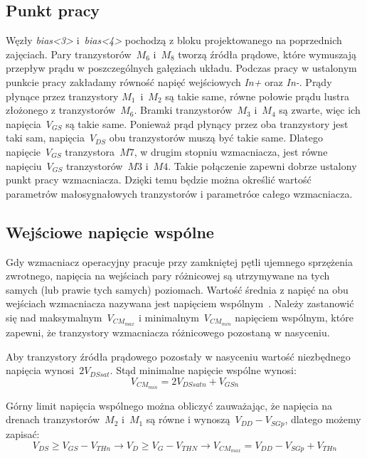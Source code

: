 \documentclass[twoside,pl,final]{labman}
\begin{document}
\subsection{Punkt pracy}
\label{schematic:op}
Węzły \emph{bias<3>} i~\emph{bias<4>} pochodzą z bloku
projektowanego na poprzednich zajęciach.
Pary tranzystorów~$M_6$ i~$M_8$ tworzą źródła prądowe,
które wymuszają przepływ prądu w poszczególnych gałęziach układu.
Podczas pracy w ustalonym punkcie pracy zakładamy równość
napięć wejściowych \emph{In+} oraz \emph{In-}.
Prądy płynące przez tranzystory $M_1$~i~$M_2$ są takie same,
równe połowie prądu lustra złożonego z tranzystorów~$M_6$.
Bramki tranzystorów~$M_3$ i~$M_4$ są zwarte,
więc ich napięcia~$V_{GS}$ są takie same.
Ponieważ prąd płynący przez oba tranzystory jest taki sam,
napięcia~$V_{DS}$ obu tranzystorów muszą być takie same.
Dlatego napięcie~$V_{GS}$ tranzystora~$M7$,
w drugim stopniu wzmacniacza,
jest równe napięciu~$V_{GS}$ tranzystorów~$M3$ i~$M4$.
Takie połączenie zapewni dobrze ustalony punkt pracy wzmacniacza.
Dzięki temu będzie można określić wartość parametrów małosygnałowych
tranzystorów i parametróœ całego wzmacniacza.

\subsection{Wejściowe napięcie wspólne}
\label{schematic:cm}
Gdy wzmacniacz operacyjny pracuje przy
zamkniętej pętli ujemnego sprzężenia zwrotnego,
napięcia na wejściach pary różnicowej są utrzymywane na tych samych
(lub prawie tych samych) poziomach.
Wartość średnia z napięć na obu wejściach wzmacniacza
nazywana jest napięciem wspólnym~.
Należy zastanowić się nad maksymalnym~$V_{CM_{max}}$ i
minimalnym~$V_{CM_{min}}$ napięciem wspólnym, które zapewni,
że tranzystory wzmacniacza różnicowego pozostaną w nasyceniu.

Aby tranzystory źródła prądowego pozostały w nasyceniu
wartość niezbędnego napięcia wynosi~$2V_{DSsat}$.
Stąd minimalne napięcie wspólne wynosi:
\begin{equation}
  V_{CM_{min}} = 2V_{DSsatn} + V_{GSn}
\end{equation}

Górny limit napięcia wspólnego można obliczyć zauważając,
że napięcia na drenach tranzystorów~$M_2$ i~$M_1$ są równe i wynoszą~$V_{DD} - V_{SGp}$,
dlatego możemy zapisać:
\begin{equation}
  V_{DS} \geq V_{GS} - V_{THn} \rightarrow
  V_D \geq V_G - V_{THN} \rightarrow
  V_{CM_{max}} = V_{DD} - V_{SGp} + V_{THn}
\end{equation}
\end{document}
